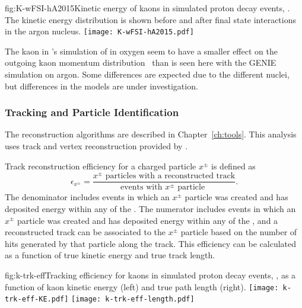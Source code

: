 \begin{dunefigure}{fig:K-wFSI-hA2015}{Kinetic energy of kaons in simulated proton decay events, \ptoknubar.  The kinetic energy distribution is shown before and after final state interactions in the argon nucleus.}
\texttt{[image: K-wFSI-hA2015.pdf]}
\end{dunefigure}

The kaon  in \superk's simulation of \ptoknubar in oxygen seem to have a smaller effect on the outgoing kaon momentum distribution~\cite{Abe:2014mwa} than is seen here with the GENIE simulation on argon.  Some differences are expected due to the different nuclei, but differences in the  models are under investigation.

\subsubsection{Tracking and Particle Identification}
\label{sec:event-reconstruction}

The  reconstruction algorithms are described in Chapter~\ref{ch:tools}.  This analysis uses \threed track and vertex reconstruction provided by .

Track reconstruction efficiency for a charged particle $x^{\pm}$ is defined as 
\begin{equation}
\epsilon_{x^{\pm}} = \frac{\mbox{$x^{\pm}$ particles with a reconstructed track}}{\mbox{events with $x^{\pm}$ particle }}.
\end{equation}
The denominator includes events in which an $x^{\pm}$ particle was created and has deposited energy within any of the .  The numerator includes events in which an $x^{\pm}$ particle was created and has deposited energy within any of the , and a reconstructed track can be associated to the $x^{\pm}$ particle based on the number of hits generated by that particle along the track. This efficiency can be calculated as a function of true kinetic energy and true track length.

\begin{dunefigure}{fig:k-trk-eff}{Tracking efficiency for kaons in simulated proton decay events, \ptoknubar, as a function of kaon kinetic energy (left) and true path length (right).}
\texttt{[image: k-trk-eff-KE.pdf]}
\texttt{[image: k-trk-eff-length.pdf]}
\end{dunefigure}


